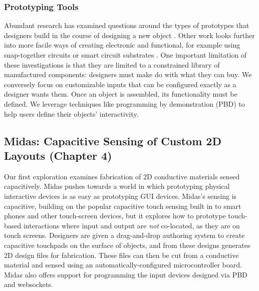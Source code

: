 \subsubsection{Prototyping Tools}
Abundant research has examined questions around the types of prototypes that designers build in the course of designing a new object \cite{houde-prototypes}. Other work looks further into more facile ways of creating electronic and functional, for example using snap-together circuits \cite{littleBits, hartmann-dtools, villar-gadgeteer} or smart circuit substrates \cite{villar-voodooio}. One important limitation of these investigations is that they are limited to a constrained library of manufactured components: designers must make do with what they can buy. We conversely focus on customizable inputs that can be configured exactly as a designer wants them. Once an object is assembled, its functionality must be defined. We leverage techniques like programming by demonstration (PBD) \cite{myers-pbd, hartmann-dtools} to help users define their objects' interactivity.


\subsection{Midas: Capacitive Sensing of Custom 2D Layouts (Chapter 4)}

Our first exploration examines fabrication of 2D conductive materials sensed capacitively. Midas pushes towards a world in which prototyping physical interactive devices is as easy as prototyping GUI devices. Midas's sensing is capacitive, building on the popular capacitive touch sensing built in to smart phones and other touch-screen devices, but it explores how to prototype touch-based interactions where input and output are \emph{not} co-located, as they are on touch screens. Designers are given a drag-and-drop authoring system to create capacitive touchpads on the surface of objects, and from these designs generates 2D design files for fabrication. These files can then be cut from a conductive material and sensed using an automatically-configured microcontroller board. Midas also offers support for programming the input devices designed via PBD and websockets.

